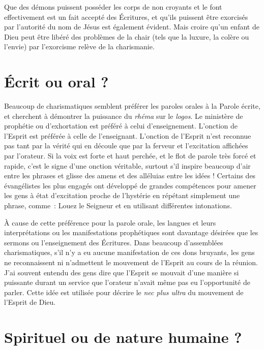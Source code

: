 Que des démons puissent posséder les corps de non croyants
 et le font effectivement est un fait accepté des Écritures,
 et qu'ils puissent être exorcisés par l'autorité du nom de Jésus
 est également évident. Mais croire qu'un enfant de Dieu peut être libéré
 des problèmes de la chair (tels que la luxure, la colère ou l'envie)
 par l'exorcisme relève de la charismanie.


\section{\'Ecrit ou oral ?}

Beaucoup de charismatiques semblent préférer les paroles orales
 à la Parole écrite, et cherchent à démontrer la puissance
 du \emph{rhéma} sur le \emph{logos}.
 Le ministère de prophétie ou d'exhortation
 est préféré à celui d'enseignement. L'onction de l'Esprit est préférée
 à celle de l'enseignant. L'onction de l'Esprit n'est reconnue
 pas tant par la vérité qui en découle que par la ferveur
 et l'excitation affichées par l'orateur. Si la voix est forte
 et haut perchée, et le flot de parole très forcé et rapide,
 c'est le signe d'une onction véritable, surtout s'il inspire beaucoup
 d'air entre les phrases et glisse des amens et des alléluias
 entre les idées ! Certains des évangélistes les plus engagés
 ont développé de grandes compétences pour amener les gens
 à état d'excitation proche de l'hystérie en répétant simplement
 une phrase, comme~: \og Louez le Seigneur \fg{} et en utilisant différentes
 intonations.

À cause de cette préférence pour la parole orale, les langues
 et leurs interprétations ou les manifestations prophétiques
 sont davantage désirées que les sermons ou l'enseignement des Écritures.
 Dans beaucoup d'assemblées charismatiques, s'il n'y a eu aucune
 manifestation de ces dons bruyants, les gens ne reconnaissent ni
 n'admettent le mouvement de l'Esprit au cours de la réunion.
 J'ai souvent entendu des gens dire que l'Esprit se mouvait d'une manière
 si puissante durant un service que l'orateur n'avait même pas eu
 l'opportunité de parler. Cette idée est utilisée pour décrire le
 \emph{nec plus ultra} du mouvement de l'Esprit de Dieu.


\section{Spirituel ou de nature humaine ?}

